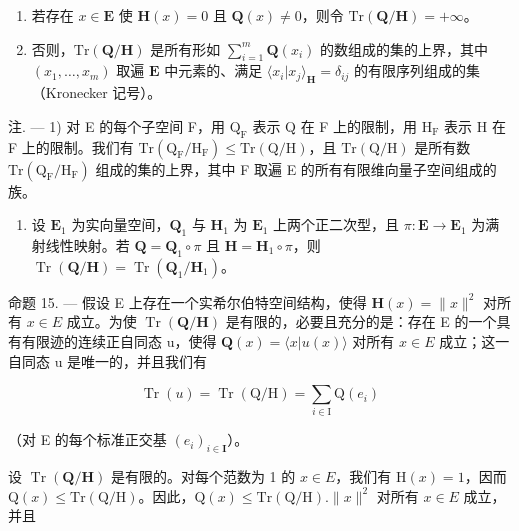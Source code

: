 \begin{enumerate}
\def\labelenumi{\alph{enumi})}
\tightlist
\item
  若存在 \(x \in \mathbf{E}\) 使 \(\mathbf{H}(x) = 0\) 且 \(\mathbf{Q}(x) \neq 0\)，则令 \(\mathrm{Tr}(\mathbf{Q} / \mathbf{H}) = +\infty\)。
\item
  否则，\(\mathrm{Tr}(\mathbf{Q} / \mathbf{H})\) 是所有形如 \(\sum_{i=1}^{m} \mathbf{Q}(x_i)\) 的数组成的集的上界，其中 \((x_1, \ldots, x_m)\) 取遍 \(\mathbf{E}\) 中元素的、满足 \(\langle x_i | x_j \rangle_{\mathbf{H}} = \delta_{ij}\) 的有限序列组成的集（Kronecker 记号）。
\end{enumerate}

注. --- 1) 对 E 的每个子空间 F，用 \(\mathrm{Q}_{\mathrm{F}}\) 表示 Q 在 F 上的限制，用 \(\mathrm{H}_{\mathrm{F}}\) 表示 H 在 F 上的限制。我们有 \(\mathrm{Tr}(\mathrm{Q}_{\mathrm{F}} / \mathrm{H}_{\mathrm{F}}) \leqslant \mathrm{Tr}(\mathrm{Q} / \mathrm{H})\)，且 \(\mathrm{Tr}(\mathrm{Q} / \mathrm{H})\) 是所有数 \(\mathrm{Tr}(\mathrm{Q}_{\mathrm{F}} / \mathrm{H}_{\mathrm{F}})\) 组成的集的上界，其中 F 取遍 E 的所有有限维向量子空间组成的族。

\begin{enumerate}
\def\labelenumi{\arabic{enumi})}
\setcounter{enumi}{1}
\tightlist
\item
  设 \(\mathbf{E}_1\) 为实向量空间，\(\mathbf{Q}_1\) 与 \(\mathbf{H}_1\) 为 \(\mathbf{E}_1\) 上两个正二次型，且 \(\pi: \mathbf{E} \to \mathbf{E}_1\) 为满射线性映射。若 \(\mathbf{Q} = \mathbf{Q}_1 \circ \pi\) 且 \(\mathbf{H} = \mathbf{H}_1 \circ \pi\)，则 \(\operatorname{Tr}(\mathbf{Q}/\mathbf{H}) = \operatorname{Tr}(\mathbf{Q}_1/\mathbf{H}_1)\)。
\end{enumerate}

命题 15. --- 假设 E 上存在一个实希尔伯特空间结构，使得 \(\mathbf{H}(x) = \|x\|^2\) 对所有 \(x \in E\) 成立。为使 \(\operatorname{Tr}(\mathbf{Q}/\mathbf{H})\) 是有限的，必要且充分的是：存在 E 的一个具有有限迹的连续正自同态 u，使得 \(\mathbf{Q}(x) = \langle x|u(x) \rangle\) 对所有 \(x \in E\) 成立；这一自同态 u 是唯一的，并且我们有

\[
\operatorname{Tr} (u) = \operatorname{Tr} (\mathrm{Q} / \mathrm{H}) = \sum_ {i \in \mathrm{I}} \mathrm{Q} \left(e _ {i}\right)\tag{44}
\]

（对 E 的每个标准正交基 \((e_i)_{i\in \mathbf{I}}\)）。

设 \(\operatorname{Tr}(\mathbf{Q} / \mathbf{H})\) 是有限的。对每个范数为 1 的 \(x\in E\)，我们有 \(\mathrm{H}(x) = 1\)，因而 \(\mathrm{Q}(x)\leqslant \mathrm{Tr}(\mathrm{Q} / \mathrm{H})\)。因此，\(\mathrm{Q}(x)\leqslant \mathrm{Tr}(\mathrm{Q} / \mathrm{H}).\| x\|^2\) 对所有 \(x\in E\) 成立，并且

